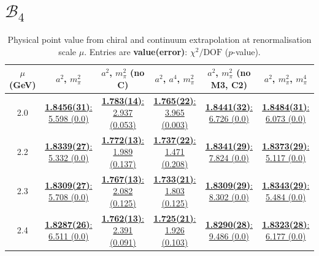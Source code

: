 \documentclass[12pt]{extarticle}
\begin{document}
\section{$\mathcal{B}_4$}
\begin{table}[h!]
\begin{center}
\begin{tabular}{|c|c|c|c|c|c|}
\hline
$\mu$ (GeV) & $a^2$, $m_\pi^2$& $a^2$, $m_\pi^2$ (no C)& $a^2$, $a^4$, $m_\pi^2$& $a^2$, $m_\pi^2$ (no M3, C2)& $a^2$, $m_\pi^2$, $m_\pi^4$\\
\hline
2.0& \hyperlink{SSpPP/SUSY/a2m2_20.pdf.1}{\textbf{1.8456(31)}: 5.598 (0.0)} & \hyperlink{SSpPP/SUSY/a2m2noC_20.pdf.1}{\textbf{1.783(14)}: 2.937 (0.053)} & \hyperlink{SSpPP/SUSY/a2a4m2_20.pdf.1}{\textbf{1.765(22)}: 3.965 (0.003)} & \hyperlink{SSpPP/SUSY/a2m2mcut_20.pdf.1}{\textbf{1.8441(32)}: 6.726 (0.0)} & \hyperlink{SSpPP/SUSY/a2m2m4_20.pdf.1}{\textbf{1.8484(31)}: 6.073 (0.0)}\\
2.2& \hyperlink{SSpPP/SUSY/a2m2_22.pdf.1}{\textbf{1.8339(27)}: 5.332 (0.0)} & \hyperlink{SSpPP/SUSY/a2m2noC_22.pdf.1}{\textbf{1.772(13)}: 1.989 (0.137)} & \hyperlink{SSpPP/SUSY/a2a4m2_22.pdf.1}{\textbf{1.737(22)}: 1.471 (0.208)} & \hyperlink{SSpPP/SUSY/a2m2mcut_22.pdf.1}{\textbf{1.8341(29)}: 7.824 (0.0)} & \hyperlink{SSpPP/SUSY/a2m2m4_22.pdf.1}{\textbf{1.8373(29)}: 5.117 (0.0)}\\
2.3& \hyperlink{SSpPP/SUSY/a2m2_23.pdf.1}{\textbf{1.8309(27)}: 5.708 (0.0)} & \hyperlink{SSpPP/SUSY/a2m2noC_23.pdf.1}{\textbf{1.767(13)}: 2.082 (0.125)} & \hyperlink{SSpPP/SUSY/a2a4m2_23.pdf.1}{\textbf{1.733(21)}: 1.803 (0.125)} & \hyperlink{SSpPP/SUSY/a2m2mcut_23.pdf.1}{\textbf{1.8309(29)}: 8.302 (0.0)} & \hyperlink{SSpPP/SUSY/a2m2m4_23.pdf.1}{\textbf{1.8343(29)}: 5.484 (0.0)}\\
2.4& \hyperlink{SSpPP/SUSY/a2m2_24.pdf.1}{\textbf{1.8287(26)}: 6.511 (0.0)} & \hyperlink{SSpPP/SUSY/a2m2noC_24.pdf.1}{\textbf{1.762(13)}: 2.391 (0.091)} & \hyperlink{SSpPP/SUSY/a2a4m2_24.pdf.1}{\textbf{1.725(21)}: 1.926 (0.103)} & \hyperlink{SSpPP/SUSY/a2m2mcut_24.pdf.1}{\textbf{1.8290(28)}: 9.486 (0.0)} & \hyperlink{SSpPP/SUSY/a2m2m4_24.pdf.1}{\textbf{1.8323(28)}: 6.177 (0.0)}\\
\hline
\end{tabular}
\caption{Physical point value from chiral and continuum extrapolation at renormalisation scale $\mu$. Entries are \textbf{value(error)}: $\chi^2/\text{DOF}$ ($p$-value).}
\end{center}
\end{table}
\end{document}
